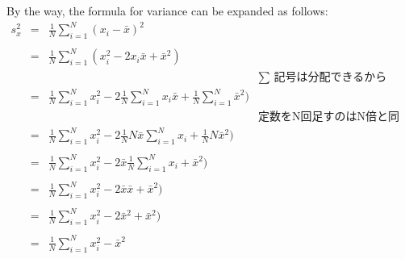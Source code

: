 \documentclass{ltjbook}
\begin{document}
By the way, the formula for variance can be expanded as follows:
\[
	\begin{array}{lllr}
		s_x^2 & = & \frac{1}{N}\sum_{i=1}^N (x_i - \bar{x})^2                                                                                           \\
		\\
		      & = & \frac{1}{N}\sum_{i=1}^N (x_i^2 - 2x_i\bar{x} + \bar{x}^2)                                                                           \\
		      &   &                                                                                                          & \mbox{$\sum$ 記号は分配できるから} \\
		      & = & \frac{1}{N}\sum_{i=1}^N x_i^2 - 2\frac{1}{N}\sum_{i=1}^N x_i\bar{x} + \frac{1}{N}\sum_{i=1}^N \bar{x}^2)                            \\
		      &   &                                                                                                          & \mbox{定数をN回足すのはN倍と同じなので} \\
		      & = & \frac{1}{N}\sum_{i=1}^N x_i^2 - 2\frac{1}{N}N\bar{x}\sum_{i=1}^N x_i + \frac{1}{N}N\bar{x}^2)                                       \\
		      &   &                                                                                                                                     \\
		      & = & \frac{1}{N}\sum_{i=1}^N x_i^2 - 2\bar{x}\frac{1}{N}\sum_{i=1}^N x_i + \bar{x}^2)                                                    \\
		      &   &                                                                                                                                     \\
		      & = & \frac{1}{N}\sum_{i=1}^N x_i^2 - 2\bar{x}\bar{x}+ \bar{x}^2)                                                                         \\
		      &   &                                                                                                                                     \\
		      & = & \frac{1}{N}\sum_{i=1}^N x_i^2 - 2\bar{x}^2+ \bar{x}^2)                                                                              \\
		      &   &                                                                                                                                     \\
		      & = & \frac{1}{N}\sum_{i=1}^N x_i^2 - \bar{x}^2
	\end{array}
\]
\end{document}
